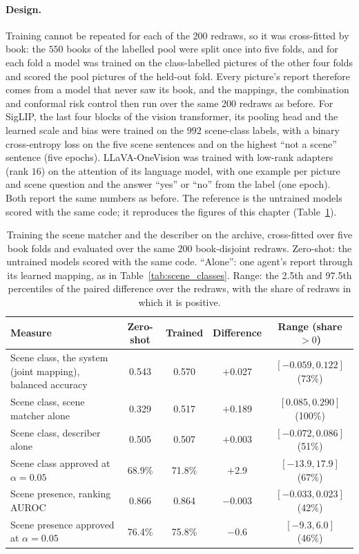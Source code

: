 \paragraph{Design.} Training cannot be repeated for each of the 200 redraws, so it was cross-fitted by book: the $550$ books of the labelled pool were split once into five folds, and for each fold a model was trained on the class-labelled pictures of the other four folds and scored the pool pictures of the held-out fold. Every picture's report therefore comes from a model that never saw its book, and the mappings, the combination and conformal risk control then run over the same 200 redraws as before. For SigLIP, the last four blocks of the vision transformer, its pooling head and the learned scale and bias were trained on the $992$ scene-class labels, with a binary cross-entropy loss on the five scene sentences and on the highest ``not a scene'' sentence (five epochs). LLaVA-OneVision was trained with low-rank adapters (rank $16$) on the attention of its language model, with one example per picture and scene question and the answer ``yes'' or ``no'' from the label (one epoch). Both report the same numbers as before. The reference is the untrained models scored with the same code; it reproduces the figures of this chapter (Table~\ref{tab:finetune}).

\begin{table}[!htbp]
\centering
\caption[Training the agents on the archive]{Training the scene matcher and the describer on the archive, cross-fitted over five book folds and evaluated over the same 200 book-disjoint redraws. Zero-shot: the untrained models scored with the same code. ``Alone'': one agent's report through its learned mapping, as in Table~\ref{tab:scene_classes}. Range: the 2.5th and 97.5th percentiles of the paired difference over the redraws, with the share of redraws in which it is positive.}
\label{tab:finetune}
\small
\begin{tabular}{>{\raggedright\arraybackslash}p{5.0cm} c c c c}
\toprule
Measure & Zero-shot & Trained & Difference & Range (share $>0$) \\
\midrule
Scene class, the system (joint mapping), balanced accuracy & 0.543 & 0.570 & $+$0.027 & $[-0.059, 0.122]$ (73\%) \\
Scene class, scene matcher alone & 0.329 & 0.517 & $+$0.189 & $[0.085, 0.290]$ (100\%) \\
Scene class, describer alone & 0.505 & 0.507 & $+$0.003 & $[-0.072, 0.086]$ (51\%) \\
Scene class approved at $\alpha=0.05$ & 68.9\% & 71.8\% & $+$2.9 & $[-13.9, 17.9]$ (67\%) \\
Scene presence, ranking AUROC & 0.866 & 0.864 & $-$0.003 & $[-0.033, 0.023]$ (42\%) \\
Scene presence approved at $\alpha=0.05$ & 76.4\% & 75.8\% & $-$0.6 & $[-9.3, 6.0]$ (46\%) \\
\bottomrule
\end{tabular}
\end{table}

